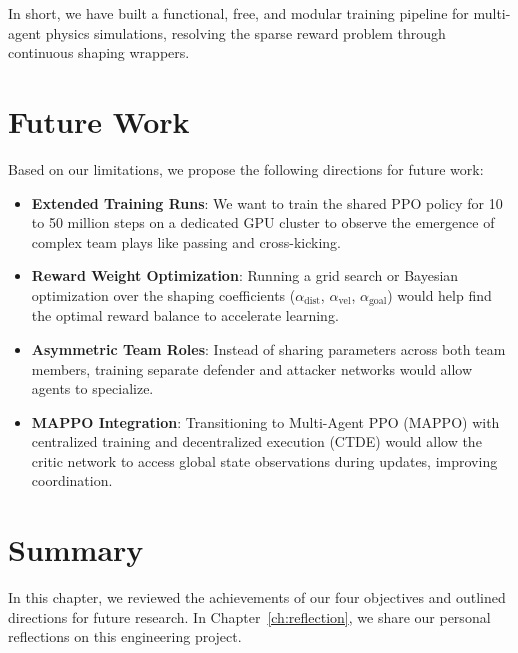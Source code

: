 In short, we have built a functional, free, and modular training pipeline for multi-agent physics simulations, resolving the sparse reward problem through continuous shaping wrappers.

\section{Future Work}
\label{sec:future_work}

Based on our limitations, we propose the following directions for future work:
\begin{itemize}
    \item \textbf{Extended Training Runs}: We want to train the shared PPO policy for 10 to 50 million steps on a dedicated GPU cluster to observe the emergence of complex team plays like passing and cross-kicking.
    \item \textbf{Reward Weight Optimization}: Running a grid search or Bayesian optimization over the shaping coefficients ($\alpha_\text{dist}$, $\alpha_\text{vel}$, $\alpha_\text{goal}$) would help find the optimal reward balance to accelerate learning.
    \item \textbf{Asymmetric Team Roles}: Instead of sharing parameters across both team members, training separate defender and attacker networks would allow agents to specialize.
    \item \textbf{MAPPO Integration}: Transitioning to Multi-Agent PPO (MAPPO) with centralized training and decentralized execution (CTDE) would allow the critic network to access global state observations during updates, improving coordination.
\end{itemize}

\section{Summary}
\label{sec:con_summary}

In this chapter, we reviewed the achievements of our four objectives and outlined directions for future research. In Chapter~\ref{ch:reflection}, we share our personal reflections on this engineering project.